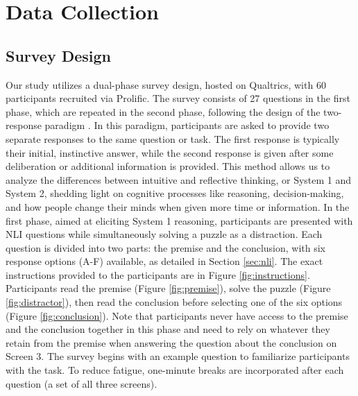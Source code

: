 \section{Data Collection} \label{sec:data_collection}
    \subsection{Survey Design}
        
        Our study utilizes a dual-phase survey design, hosted on Qualtrics, with 60 participants recruited via Prolific. The survey consists of 27 questions in the first phase, which are repeated in the second phase, following the design of the two-response paradigm \citep{bago_fast_2017}. In this paradigm, participants are asked to provide two separate responses to the same question or task. The first response is typically their initial, instinctive answer, while the second response is given after some deliberation or additional information is provided. This method allows us to analyze the differences between intuitive and reflective thinking, or System 1 and System 2, shedding light on cognitive processes like reasoning, decision-making, and how people change their minds when given more time or information. In the first phase, aimed at eliciting System 1 reasoning, participants are presented with NLI questions while simultaneously solving a puzzle as a distraction. Each question is divided into two parts: the premise and the conclusion, with six response options (A-F) available, as detailed in Section \ref{sec:nli}. The exact instructions provided to the participants are in Figure \ref{fig:instructions}. Participants read the premise (Figure \ref{fig:premise}), solve the puzzle (Figure \ref{fig:distractor}), then read the conclusion before selecting one of the six options (Figure \ref{fig:conclusion}). Note that participants never have access to the premise and the conclusion together in this phase and need to rely on whatever they retain from the premise when answering the question about the conclusion on Screen 3. The survey begins with an example question to familiarize participants with the task. To reduce fatigue, one-minute breaks are incorporated after each question (a set of all three screens).

